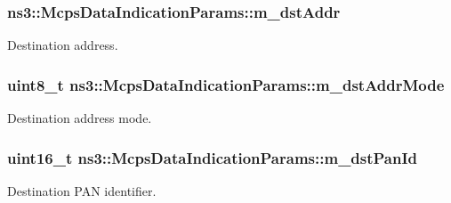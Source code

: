 \subsubsection[{\texorpdfstring{m\+\_\+dst\+Addr}{m_dstAddr}}]{ ns3\+::\+Mcps\+Data\+Indication\+Params\+::m\+\_\+dst\+Addr}\hypertarget{structns3_1_1McpsDataIndicationParams_a02aa5d21326ac78f6bde548ef5609105}{}\label{structns3_1_1McpsDataIndicationParams_a02aa5d21326ac78f6bde548ef5609105}


Destination address. 

\subsubsection[{\texorpdfstring{m\+\_\+dst\+Addr\+Mode}{m_dstAddrMode}}]{\setlength{\rightskip}{0pt plus 5cm}uint8\+\_\+t ns3\+::\+Mcps\+Data\+Indication\+Params\+::m\+\_\+dst\+Addr\+Mode}\hypertarget{structns3_1_1McpsDataIndicationParams_a081c9ce94b42c5c8108dee8117df3ff2}{}\label{structns3_1_1McpsDataIndicationParams_a081c9ce94b42c5c8108dee8117df3ff2}


Destination address mode. 

\subsubsection[{\texorpdfstring{m\+\_\+dst\+Pan\+Id}{m_dstPanId}}]{\setlength{\rightskip}{0pt plus 5cm}uint16\+\_\+t ns3\+::\+Mcps\+Data\+Indication\+Params\+::m\+\_\+dst\+Pan\+Id}\hypertarget{structns3_1_1McpsDataIndicationParams_a1bd1e3d38fb8590ab112dec199343871}{}\label{structns3_1_1McpsDataIndicationParams_a1bd1e3d38fb8590ab112dec199343871}


Destination P\+AN identifier. 

